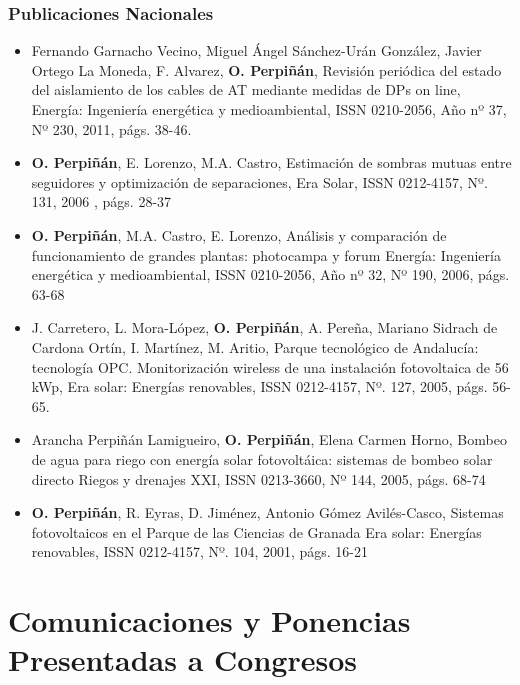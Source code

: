 \documentclass[article, a4paper]{memoir}
\begin{document}
\subsubsection{Publicaciones Nacionales}
\label{sec-5-2-2}

\begin{itemize}
\item Fernando Garnacho Vecino, Miguel Ángel Sánchez-Urán González, Javier
Ortego La Moneda, F. Alvarez, \textbf{O. Perpiñán},
Revisión periódica del estado del aislamiento de los cables de
AT mediante medidas de DPs on line, Energía: Ingeniería
energética y medioambiental, ISSN 0210-2056, Año nº 37, Nº
230, 2011, págs. 38-46.

\item \textbf{O. Perpiñán}, E. Lorenzo, M.A. Castro, Estimación de sombras mutuas
entre seguidores y optimización de separaciones, Era Solar, ISSN
0212-4157, Nº. 131, 2006 , págs. 28-37

\item \textbf{O. Perpiñán}, M.A. Castro, E. Lorenzo, Análisis y
comparación de funcionamiento de grandes plantas: photocampa y forum
Energía: Ingeniería energética y medioambiental, ISSN 0210-2056, Año
nº 32, Nº 190, 2006, págs. 63-68

\item J. Carretero, L. Mora-López, \textbf{O. Perpiñán}, A. Pereña, Mariano Sidrach
de Cardona Ortín, I. Martínez, M. Aritio, Parque tecnológico de
Andalucía: tecnología OPC. Monitorización wireless de una
instalación fotovoltaica de 56 kWp, Era solar: Energías renovables,
ISSN 0212-4157, Nº. 127, 2005, págs. 56-65.

\item Arancha Perpiñán Lamigueiro, \textbf{O. Perpiñán}, Elena Carmen
Horno, Bombeo de agua para riego con energía solar fotovoltáica:
sistemas de bombeo solar directo Riegos y drenajes XXI, ISSN
0213-3660, Nº 144, 2005, págs. 68-74

\item \textbf{O. Perpiñán}, R. Eyras, D. Jiménez, Antonio Gómez
Avilés-Casco, Sistemas fotovoltaicos en el Parque de las
Ciencias de Granada Era solar: Energías renovables, ISSN
0212-4157, Nº. 104, 2001, págs. 16-21
\end{itemize}


\section{Comunicaciones y Ponencias Presentadas a Congresos}
\label{sec-6}
\end{document}
